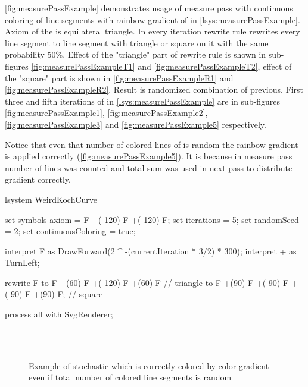 \autoref{fig:measurePassExample} demonstrates usage of measure pass with continuous coloring of line segments with rainbow gradient of \lsystem in \autoref{lsys:measurePassExample}.
Axiom of the \lsystem is equilateral triangle.
In every iteration rewrite rule rewrites every line segment to line segment with triangle or square on it with the same probability 50\%.
Effect of the "triangle" part of rewrite rule is shown in sub-figures \ref{fig:measurePassExampleT1} and \ref{fig:measurePassExampleT2},
	effect of the "square" part is shown in \ref{fig:measurePassExampleR1} and \ref{fig:measurePassExampleR2}.
Result is randomized combination of previous.
First three and fifth iterations of \lsystem in \autoref{lsys:measurePassExample} are in sub-figures \ref{fig:measurePassExample1}, \ref{fig:measurePassExample2}, \ref{fig:measurePassExample3} and \ref{fig:measurePassExample5} respectively.

Notice that even that number of colored lines of \lsystem is random the rainbow gradient is applied correctly (\autoref{fig:measurePassExample5}).
It is because in measure pass number of lines was counted and total sum was used in next pass to distribute gradient correctly.



\begin{Lsystem}[label=lsys:measurePassExample,caption={Stochastic \lsystem with variable number of line segments}]
lsystem WeirdKochCurve {
	set symbols axiom = F +(-120) F +(-120) F;
	set iterations = 5;
	set randomSeed = 2;
	set continuousColoring = true;

	interpret F as DrawForward(2 ^ -(currentIteration * 3/2) * 300);
	interpret + as TurnLeft;

	rewrite F
		to F +(60) F     +(-120)     F +(60) F  // triangle
		to F +(90) F +(-90) F +(-90) F +(90) F; // square
}
process all with SvgRenderer;
\end{Lsystem}

\begin{figure}[p]
	\centering
	 ~
	 ~
	 ~
	\\
	 ~
	 ~
	\\
	\caption{Example of stochastic \lsystem which is correctly colored by color gradient even if total number of colored line segments is random}
	\label{fig:measurePassExample}
\end{figure}

